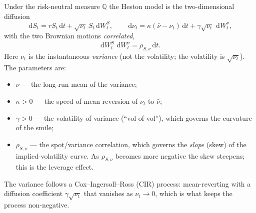 \documentclass[11pt]{article}
\newcommand{\dd}{\,\mathrm{d}}
\begin{document}
Under the risk-neutral measure $\mathbb{Q}$ the Heston model is the two-dimensional
diffusion
\begin{equation}
\dd S_t = r S_t \dd t + \sqrt{\nu_t}\, S_t \dd W^S_t,
\qquad
\dd \nu_t = \kappa(\bar\nu - \nu_t)\dd t + \gamma \sqrt{\nu_t}\, \dd W^\nu_t,
\label{eq:heston}
\end{equation}
with the two Brownian motions \emph{correlated},
\begin{equation}
\dd W^S_t\, \dd W^\nu_t = \rho_{S,\nu}\dd t.
\end{equation}
Here $\nu_t$ is the instantaneous \emph{variance} (not the volatility; the volatility is
$\sqrt{\nu_t}$). The parameters are:
\begin{itemize}[noitemsep]
\item $\bar\nu$ --- the long-run mean of the variance;
\item $\kappa>0$ --- the speed of mean reversion of $\nu_t$ to $\bar\nu$;
\item $\gamma>0$ --- the volatility of variance (``vol-of-vol''), which governs the
curvature of the smile;
\item $\rho_{S,\nu}$ --- the spot/variance correlation, which governs the \emph{slope}
(skew) of the implied-volatility curve. As $\rho_{S,\nu}$ becomes more negative the skew
steepens; this is the leverage effect.
\end{itemize}
The variance follows a Cox--Ingersoll--Ross (CIR) process: mean-reverting with a
diffusion coefficient $\gamma\sqrt{\nu_t}$ that vanishes as $\nu_t\to0$, which is what
keeps the process non-negative.
\end{document}
